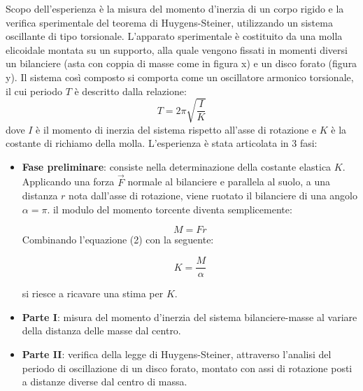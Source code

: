 Scopo dell’esperienza è la misura del momento d’inerzia di un corpo rigido e la verifica sperimentale del teorema di Huygens-Steiner, utilizzando un sistema oscillante di tipo torsionale. L’apparato sperimentale è costituito da una molla elicoidale montata su un supporto, alla quale vengono fissati in momenti diversi un bilanciere (asta con coppia di masse come in figura x) e un disco forato (figura y). Il sistema così composto si comporta come un oscillatore armonico torsionale, il cui periodo $T$ è descritto dalla relazione:
\begin{equation}
	T=2\pi\sqrt{\frac{I}{K}}
\end{equation}
dove $I$ è il momento di inerzia del sistema rispetto all’asse di rotazione e $K$ è la costante di richiamo della molla. L'esperienza è stata articolata in 3 fasi:

\begin{itemize}
    \item \textbf{Fase preliminare}: consiste nella determinazione della costante elastica $K$. Applicando una forza $\vec{F}$ normale al bilanciere e parallela al suolo, a una distanza $r$ nota dall'asse di rotazione, viene ruotato il bilanciere di una angolo $\alpha = \pi$. il modulo del momento torcente diventa semplicemente:

    \begin{equation}
    	M = Fr
    \end{equation}
    Combinando l'equazione (2) con la seguente:

    \begin{equation}
        K=\frac{M}{\alpha}
    \end{equation}

    si riesce a ricavare una stima per $K$.
    \item \textbf{Parte I}: misura del momento d’inerzia del sistema bilanciere-masse al variare della distanza delle masse dal centro. 
    \item \textbf{Parte II}: verifica della legge di Huygens-Steiner, attraverso l’analisi del periodo di oscillazione di un disco forato, montato con assi di rotazione posti a distanze diverse dal centro di massa.
\end{itemize}